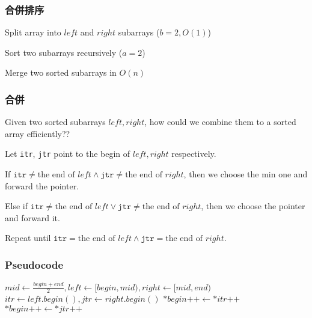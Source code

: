 \documentclass{beamer}
\begin{document}
\frame
{
	\frametitle{合併排序}
	
	\begin{description}
		\item<1->[Divide]Split array into $left$ and $right$ subarrays ($b = 2, O(1)$)
		\item<2->[Conquer]Sort two subarrays recursively ($a = 2$)
		\item<3->[Combine]Merge two sorted subarrays in $O(n)$
	\end{description}
}

\frame
{
	\frametitle{合併}
	
	Given two sorted subarrays $left, right$, how could we combine them to a sorted array efficiently??\pause
	
	Let \texttt{itr}, \texttt{jtr} point to the begin of $left, right$ respectively.\pause
	
	If $\texttt{itr} \neq \text{the end of }left \land \texttt{jtr} \neq \text{the end of }right$, then we choose the min one and forward the pointer.\pause
	
	Else if $\texttt{itr} \neq \text{the end of }left \lor \texttt{jtr} \neq \text{the end of }right$, then we choose the pointer and forward it.\pause
	
	Repeat until $\texttt{itr} = \text{the end of }left \land \texttt{jtr} = \text{the end of }right$.
}

\frame
{
	\frametitle{Pseudocode}
	
	\begin{algorithmic}
			\pause
				\State\Return
			\EndIf
			\pause
            \State$mid\gets\frac{begin+end}{2}, left\gets[begin, mid), right\gets[mid, end)$
            \pause
            \State{}
            \State{} 
            \pause
            \State$itr\gets left.begin(), jtr\gets right.begin()$
					\State$*begin\texttt{++}\gets*itr\texttt{++}$
				\Else
					\State$*begin\texttt{++}\gets*jtr\texttt{++}$
				\EndIf
            \EndWhile
        \EndProcedure
	\end{algorithmic}
}
\end{document}
